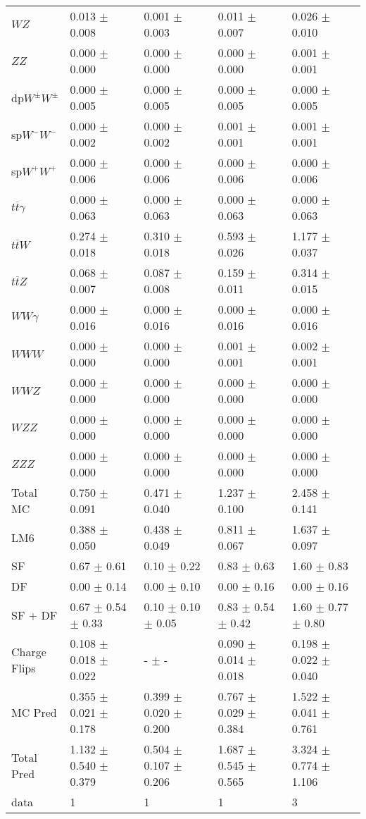 \begin{tabular}{l | l l l l}
$WZ$ &  0.013 $\pm$  0.008 &  0.001 $\pm$  0.003 &  0.011 $\pm$  0.007 &  0.026 $\pm$  0.010\\
$ZZ$ &  0.000 $\pm$   0.000 &   0.000 $\pm$   0.000 &   0.000 $\pm$   0.000 &  0.001 $\pm$  0.001\\
\hline
dp$W^{\pm}W^{\pm}$ &  0.000 $\pm$  0.005 &  0.000 $\pm$  0.005 &  0.000 $\pm$  0.005 &  0.000 $\pm$  0.005\\
sp$W^{-}W^{-}$ &  0.000 $\pm$  0.002 &  0.000 $\pm$  0.002 &  0.001 $\pm$  0.001 &  0.001 $\pm$  0.001\\
sp$W^{+}W^{+}$ &  0.000 $\pm$  0.006 &  0.000 $\pm$  0.006 &  0.000 $\pm$  0.006 &  0.000 $\pm$  0.006\\
$t\overline{t}\gamma$ &  0.000 $\pm$  0.063 &  0.000 $\pm$  0.063 &  0.000 $\pm$  0.063 &  0.000 $\pm$  0.063\\
$t\overline{t}W$ &  0.274 $\pm$  0.018 &  0.310 $\pm$  0.018 &  0.593 $\pm$  0.026 &  1.177 $\pm$  0.037\\
$t\overline{t}Z$ &  0.068 $\pm$  0.007 &  0.087 $\pm$  0.008 &  0.159 $\pm$  0.011 &  0.314 $\pm$  0.015\\
$WW\gamma$ &  0.000 $\pm$  0.016 &  0.000 $\pm$  0.016 &  0.000 $\pm$  0.016 &  0.000 $\pm$  0.016\\
$WWW$ &   0.000 $\pm$   0.000 &   0.000 $\pm$   0.000 &  0.001 $\pm$  0.001 &  0.002 $\pm$  0.001\\
$WWZ$ &  0.000 $\pm$   0.000 &  0.000 $\pm$   0.000 &  0.000 $\pm$   0.000 &  0.000 $\pm$   0.000\\
$WZZ$ &   0.000 $\pm$   0.000 &   0.000 $\pm$   0.000 &   0.000 $\pm$   0.000 &   0.000 $\pm$   0.000\\
$ZZZ$ &  0.000 $\pm$   0.000 &   0.000 $\pm$   0.000 &   0.000 $\pm$   0.000 &   0.000 $\pm$   0.000\\
\hline
Total MC &  0.750 $\pm$  0.091 &  0.471 $\pm$  0.040 &  1.237 $\pm$  0.100 &  2.458 $\pm$  0.141\\
\hline\hline
\hline
LM6 &  0.388 $\pm$  0.050 &  0.438 $\pm$  0.049 &  0.811 $\pm$  0.067 &  1.637 $\pm$  0.097\\
\hline\hline
\hline\hline
 SF  & 0.67 $\pm$ 0.61 & 0.10 $\pm$ 0.22 & 0.83 $\pm$ 0.63 & 1.60 $\pm$ 0.83\\
 DF  & 0.00 $\pm$ 0.14 & 0.00 $\pm$ 0.10 & 0.00 $\pm$ 0.16 & 0.00 $\pm$ 0.16\\
\hline
 SF + DF  & 0.67 $\pm$ 0.54 $\pm$ 0.33 & 0.10 $\pm$ 0.10 $\pm$ 0.05 & 0.83 $\pm$ 0.54 $\pm$ 0.42 & 1.60 $\pm$ 0.77 $\pm$ 0.80\\
\hline\hline
Charge Flips & 0.108 $\pm$ 0.018 $\pm$ 0.022 & - $\pm$ - & 0.090 $\pm$ 0.014 $\pm$ 0.018 & 0.198 $\pm$ 0.022 $\pm$ 0.040\\
\hline\hline
\hline
MC Pred &  0.355 $\pm$  0.021 $\pm$  0.178 &  0.399 $\pm$  0.020 $\pm$  0.200 &  0.767 $\pm$  0.029 $\pm$  0.384 &  1.522 $\pm$  0.041 $\pm$  0.761\\
\hline\hline
Total Pred &  1.132 $\pm$  0.540 $\pm$  0.379 &  0.504 $\pm$  0.107 $\pm$  0.206 &  1.687 $\pm$  0.545 $\pm$  0.565 &  3.324 $\pm$  0.774 $\pm$  1.106\\
\hline\hline
data & 1 & 1 & 1 & 3\\
\hline\hline
\end{tabular}
